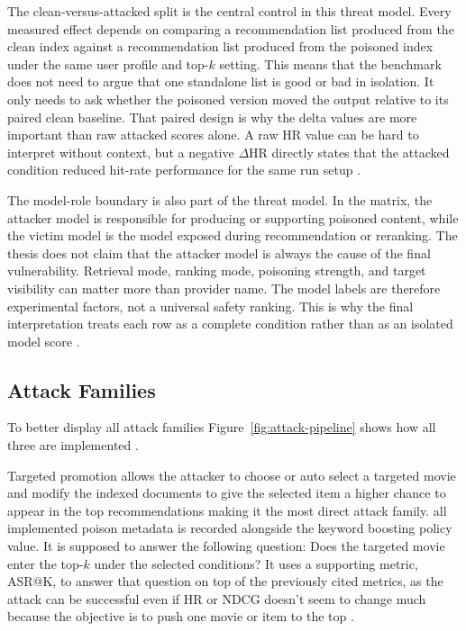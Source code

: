 The clean-versus-attacked split is the central control in this threat model. Every measured effect depends on comparing a recommendation list produced from the clean index against a recommendation list produced from the poisoned index under the same user profile and top-$k$ setting. This means that the benchmark does not need to argue that one standalone list is good or bad in isolation. It only needs to ask whether the poisoned version moved the output relative to its paired clean baseline. That paired design is why the delta values are more important than raw attacked scores alone. A raw HR value can be hard to interpret without context, but a negative $\Delta$HR directly states that the attacked condition reduced hit-rate performance for the same run setup \cite{ragpoisonlab_repo,herlocker2004evaluating}.

The model-role boundary is also part of the threat model. In the matrix, the attacker model is responsible for producing or supporting poisoned content, while the victim model is the model exposed during recommendation or reranking. The thesis does not claim that the attacker model is always the cause of the final vulnerability. Retrieval mode, ranking mode, poisoning strength, and target visibility can matter more than provider name. The model labels are therefore experimental factors, not a universal safety ranking. This is why the final interpretation treats each row as a complete condition rather than as an isolated model score \cite{ragpoisonlab_repo,hou2024llmrankers,sun2024rankgpt}.

\subsection{Attack Families}

To better display all attack families Figure~\ref{fig:attack-pipeline} shows how all three are implemented \cite{ragpoisonlab_repo}.

Targeted promotion allows the attacker to choose or auto select a targeted movie and modify the indexed documents to give the selected item a higher chance to appear in the top recommendations making it the most direct attack family. all implemented poison metadata is recorded alongside the keyword boosting policy value. It is supposed to answer the following question: Does the targeted movie enter the top-$k$ under the selected conditions? It uses a supporting metric, ASR@K,  to answer that question on top of the previously cited metrics, as the attack can be successful even if HR or NDCG doesn't seem to change much because the objective is to push one movie or item to the top \cite{ragpoisonlab_repo,nguyen2024manipulatingrecsys,wang2024recpoisonsurvey}.

